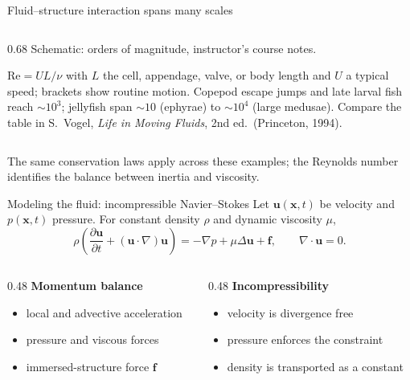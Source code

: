 \documentclass[aspectratio=169,11pt]{beamer}
\newcommand{\uvec}{\bm{u}}
\newcommand{\xvec}{\bm{x}}
\newcommand{\fvec}{\bm{f}}
\begin{document}
\begin{frame}{Fluid--structure interaction spans many scales}
\begin{columns}[T,onlytextwidth]
\begin{column}{0.68\textwidth}
{\scriptsize Schematic: orders of magnitude, instructor's course notes.}\\[1pt]
{\tiny\color{DarkGray}\(\mathrm{Re}=UL/\nu\) with \(L\) the cell, appendage, valve, or body length and \(U\) a typical speed; brackets show routine motion. Copepod escape jumps and late larval fish reach \(\sim\!10^{3}\); jellyfish span \(\sim\!10\) (ephyrae) to \(\sim\!10^{4}\) (large medusae). Compare the table in S.~Vogel, \emph{Life in Moving Fluids}, 2nd ed.\ (Princeton, 1994).\par}
\end{column}
\end{columns}
\vspace{4pt}
\begin{punchbox}
\small The same conservation laws apply across these examples; the Reynolds number identifies the balance between inertia and viscosity.
\end{punchbox}
\end{frame}

\begin{frame}{Modeling the fluid: incompressible Navier--Stokes}
Let \(\uvec(\xvec,t)\) be velocity and \(p(\xvec,t)\) pressure. For constant density \(\rho\) and dynamic viscosity \(\mu\),
\[
  \rho\left(
  \frac{\partial\uvec}{\partial t}
  +(\uvec\cdot\nabla)\uvec
  \right)
  =
  -\nabla p+\mu\Delta\uvec+\fvec,
  \qquad
  \nabla\cdot\uvec=0.
\]
\begin{columns}[T,onlytextwidth]
\begin{column}{0.48\textwidth}
\textbf{Momentum balance}
\begin{itemize}\itemsep5pt
  \item local and advective acceleration
  \item pressure and viscous forces
  \item immersed-structure force \(\fvec\)
\end{itemize}
\end{column}
\begin{column}{0.48\textwidth}
\textbf{Incompressibility}
\begin{itemize}\itemsep5pt
  \item velocity is divergence free
  \item pressure enforces the constraint
  \item density is transported as a constant
\end{itemize}
\end{column}
\end{columns}
\end{frame}
\end{document}
